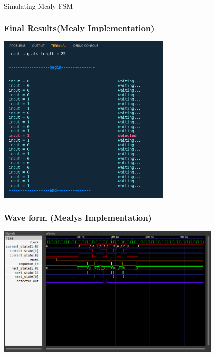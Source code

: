 \documentclass[xcolor=table]{beamer}
\begin{document}
  
\begin{frame}{Simulating Mealy FSM}
\end{frame}


\begin{frame}
  \frametitle{Final Results(Mealy Implementation)}
  \centering
  \includegraphics[width=0.65\textwidth, height=0.85\textheight]{./static/res_mealy_sim.png}
\end{frame}


\begin{frame}
  \frametitle{Wave form (Mealys Implementation)}
  \centering
  \includegraphics[width=0.85\textwidth, height=0.65\textheight]{./static/res_wave_mealy.png}
\end{frame}
\end{document}
